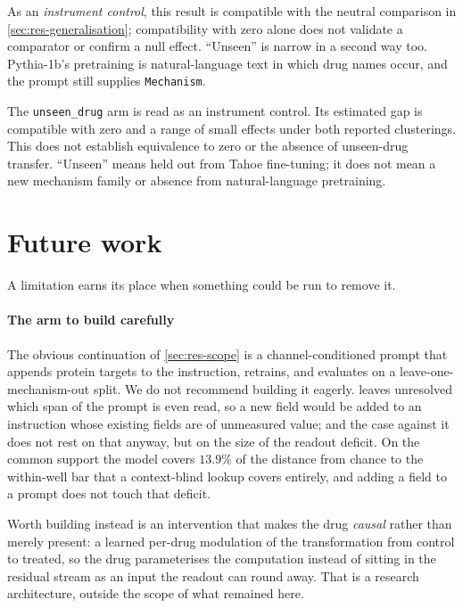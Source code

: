 

As an \emph{instrument control}, this result is compatible with the neutral
comparison in \cref{sec:res-generalisation}; compatibility with zero alone does
not validate a comparator or confirm a null effect. ``Unseen'' is narrow in a
second way too. Pythia-1b's pretraining is natural-language text in which drug
names occur, and the prompt still supplies \texttt{Mechanism}.

\begin{scopelimit}
The \texttt{unseen\_drug} arm is read as an instrument control. Its estimated
gap is compatible with zero and a range of small effects under both reported
clusterings. This does not establish equivalence to zero or the absence of
unseen-drug transfer. ``Unseen'' means held out from Tahoe fine-tuning; it does
not mean a new mechanism family or absence from natural-language pretraining.
\end{scopelimit}

\section{Future work}
\label{sec:lim-future}

A limitation earns its place when something could be run to remove it.

\paragraph{The arm to build carefully} The obvious continuation of
\cref{sec:res-scope} is a channel-conditioned prompt that appends protein targets
to the instruction, retrains, and evaluates on a leave-one-mechanism-out split.
We do not recommend building it eagerly.  leaves unresolved
which span of the prompt is even read, so a new field would be added to an
instruction whose existing fields are of unmeasured value; and the case against
it does not rest on that anyway, but on the size of the readout deficit. On the
common support the model covers $13.9\%$ of the distance from chance to the
within-well bar that a context-blind lookup covers entirely, and adding a field
to a prompt does not touch that deficit.

Worth building instead is an intervention that makes the drug \emph{causal}
rather than merely present: a learned per-drug modulation of the transformation
from control to treated, so the drug parameterises the computation instead of
sitting in the residual stream as an input the readout can round away. That is a
research architecture, outside the scope of what remained here.

